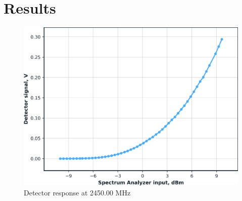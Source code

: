 \documentclass
[12pt,a4paper]
{article}
\begin{document}
\newpage
\section{Results}


\begin{figure}[htbp]
\centering
\includegraphics[width=1.0\textwidth]{measurement_data.png}
\caption{Detector response at 2450.00 MHz}
\label{Figure}
\end{figure}
\end{document}

